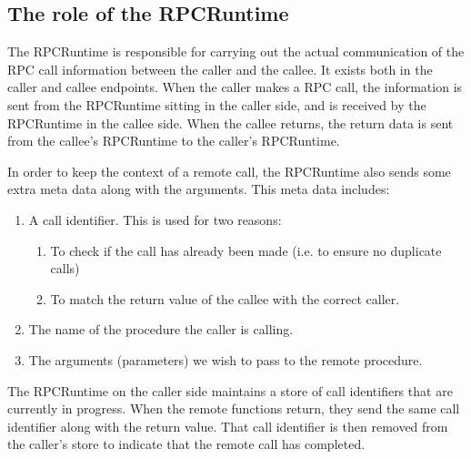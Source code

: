 \subsection{The role of the RPCRuntime}
\label{RPCRuntimeBackgroundSection} 
The RPCRuntime is responsible for carrying out the actual communication of the RPC call information between the caller and the callee. It exists both in the caller and callee endpoints. When the caller makes a RPC call, the information is sent from the RPCRuntime sitting in the caller side, and is received by the RPCRuntime in the callee side. When the callee returns, the return data is sent from the callee's RPCRuntime to the caller's RPCRuntime.

In order to keep the context of a remote call, the RPCRuntime also sends some extra meta data along with the arguments. This meta data includes: 

\begin{enumerate}
	\item A call identifier. This is used for two reasons:
	\begin{enumerate}
		\item To check if the call has already been made (i.e. to ensure no duplicate calls)
		\item To match the return value of the callee with the correct caller.
	\end{enumerate}
	\item The name of the procedure the caller is calling.
	\item The arguments (parameters) we wish to pass to the remote procedure.
\end{enumerate}

The RPCRuntime on the caller side maintains a store of call identifiers that are currently in progress. When the remote functions return, they send the same call identifier along with the return value. That call identifier is then removed from the caller's store to indicate that the remote call has completed.

